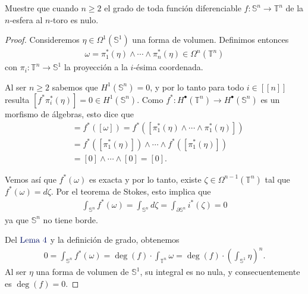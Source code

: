 \documentclass[11pt]{article}
\newcommand{\Ss}{\mathbb{S}}
\newcommand{\T}{\mathbb{T}}
\newcommand{\nat}[1]{[\![#1]\!]}
\newcommand{\paint}[1]{\color{color}{#1}}
\newcommand{\tpaing}[1]{\paint{\text{#1}}}
\newenvironment{exercise}[2][Ejercicio]{\begin{trivlist}
\item[\hskip \labelsep \paint{{\bfseries #1}}\hskip \labelsep {\bfseries #2.}]}{\end{trivlist}}
\begin{document}
\begin{exercise}{3} Muestre que cuando $n \geq 2$ el grado de toda función diferenciable $f : \Ss^n \to \T^n$ de la $n$-esfera al $n$-toro es nulo.
\end{exercise}
\begin{proof} Consideremos $\eta \in \Omega^1(\Ss^1)$ una forma de volumen. Definimos entonces
\begin{align*}
\omega = \pi^\ast_1(\eta) \wedge \cdots \wedge \pi^\ast_n(\eta) \in \Omega^n(\T^n)
\end{align*}
con $\pi_i : \T^n \to \Ss^1$ la proyección a la $i$-ésima coordenada. 

Al ser $n \geq 2$ sabemos que $H^1(\Ss^n) = 0$, y por lo tanto para todo $i \in \nat{n}$ resulta $[f^*\pi_i^*(\eta)] = 0 \in H^1(\Ss^n)$. Como $f^* : H^\bullet(\T^n) \to H^\bullet(\Ss^n)$ es un morfismo de álgebras, esto dice que
\begin{align*}
[f^*(\omega)] &= f^*([\omega]) = f^*([\pi^\ast_1(\eta) \wedge \cdots \wedge \pi^\ast_1(\eta)])\\
&= f^*([\pi^\ast_1(\eta)]) \wedge \cdots \wedge f^*([\pi^\ast_1(\eta)])\\
&= [0] \wedge \cdots \wedge [0] = [0].
\end{align*}

Vemos así que $f^*(\omega)$ es exacta y por lo tanto, existe $\zeta \in \Omega^{n-1}(\T^n)$ tal que $f^*(\omega) = d\zeta$. Por el teorema de Stokes, esto implica que
\begin{align*}
\int_{\Ss^n}f^*(\omega) = \int_{\Ss^n}d\zeta = \int_{\partial \Ss^n}i^*(\zeta) = 0
\end{align*}
ya que $\Ss^n$ no tiene borde.

Del $\tpaing{Lema $4$}$ y la definición de grado, obtenemos
\begin{align*}
0 = \int_{\Ss^n}f^*(\omega) = \deg(f) \cdot \int_{\T^n}\omega = \deg(f) \cdot \left(\int_{\Ss^1} \eta\right)^n.
\end{align*}
Al ser $\eta$ una forma de volumen de $\Ss^1$, su integral es no nula, y consecuentemente es $\deg(f) = 0$. 
\end{proof}
\end{document}
